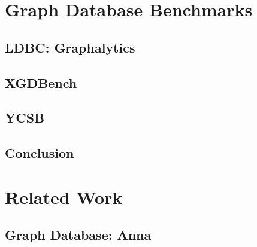 \section{Graph Database Benchmarks}

\subsection{LDBC: Graphalytics}

\subsection{XGDBench}

\subsection{YCSB}

\subsection{Conclusion}

\section{Related Work}

\subsection{Graph Database: Anna}

\subsection{}
